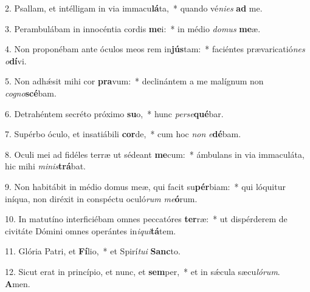 2. Psallam, et intélligam in via immacu\textbf{lá}ta,~*  quando vé\textit{ni}\textit{es} \textbf{ad} me.\

3. Perambulábam in innocéntia cordis \textbf{me}i:~*  in médio \textit{do}\textit{mus} \textbf{me}æ.\

4. Non proponébam ante óculos meos rem in\textbf{jús}tam:~*  faciéntes prævaricatió\textit{nes} \textit{o}\textbf{dí}vi.\

5. Non adhǽsit mihi cor \textbf{pra}vum:~*  declinántem a me malígnum non \textit{co}\textit{gno}\textbf{scé}bam.\

6. Detrahéntem secréto próximo \textbf{su}o,~*  hunc \textit{per}\textit{se}\textbf{qué}bar.\

7. Supérbo óculo, et insatiábili \textbf{cor}de,~*  cum hoc \textit{non} \textit{e}\textbf{dé}bam.\

8. Oculi mei ad fidéles terræ ut sédeant \textbf{me}cum:~*  ámbulans in via immaculáta, hic mihi \textit{mi}\textit{nis}\textbf{trá}bat.\

9. Non habitábit in médio domus meæ, qui facit su\textbf{pér}biam:~*  qui lóquitur iníqua, non diréxit in conspéctu oculó\textit{rum} \textit{me}\textbf{ó}rum.\

10. In matutíno interficiébam omnes peccatóres \textbf{ter}ræ:~*  ut dispérderem de civitáte Dómini omnes operántes in\textit{i}\textit{qui}\textbf{tá}tem.\

11. Glória Patri, et \textbf{Fí}lio,~*  et Spirí\textit{tu}\textit{i} \textbf{Sanc}to.\

12. Sicut erat in princípio, et nunc, et \textbf{sem}per,~*  et in sǽcula sæcu\textit{ló}\textit{rum}. \textbf{A}men.\

